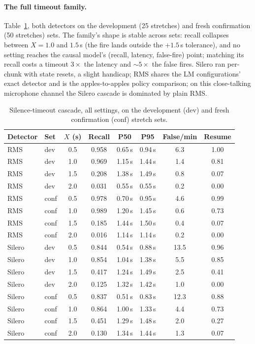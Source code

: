 \documentclass[11pt]{article}
\begin{document}
\paragraph{The full timeout family.} Table~\ref{tab:apptimeout}, both detectors on the development (25 stretches) and fresh confirmation (50 stretches) sets. The family's shape is stable across sets: recall collapses between $X{=}1.0$ and $1.5$\,s (the fire lands outside the $+1.5$\,s tolerance), and no setting reaches the causal model's (recall, latency, false-fire) point; matching its recall costs a timeout $3\times$ the latency and ${\sim}5\times$ the false fires. Silero \citep{silero2021vad} ran per-chunk with state resets, a slight handicap; RMS shares the LM configurations' exact detector and is the apples-to-apples policy comparison; on this close-talking microphone channel the Silero cascade is dominated by plain RMS.

\begin{table}[h]
  \centering\small
  \caption{Silence-timeout cascade, all settings, on the development (dev) and fresh confirmation (conf) stretch sets.}
  \label{tab:apptimeout}
  \begin{tabular}{llcccccc}
    \toprule
    Detector & Set & $X$ (s) & Recall & P50 & P95 & False/min & Resume \\
    \midrule
    RMS & dev & 0.5 & 0.958 & 0.65\,s & 0.94\,s & 6.3 & 1.00 \\
    RMS & dev & 1.0 & 0.969 & 1.15\,s & 1.44\,s & 1.4 & 0.81 \\
    RMS & dev & 1.5 & 0.208 & 1.38\,s & 1.49\,s & 0.8 & 0.07 \\
    RMS & dev & 2.0 & 0.031 & 0.55\,s & 0.55\,s & 0.2 & 0.00 \\
    RMS & conf & 0.5 & 0.978 & 0.70\,s & 0.95\,s & 4.6 & 0.99 \\
    RMS & conf & 1.0 & 0.989 & 1.20\,s & 1.45\,s & 0.6 & 0.73 \\
    RMS & conf & 1.5 & 0.185 & 1.44\,s & 1.50\,s & 0.4 & 0.07 \\
    RMS & conf & 2.0 & 0.016 & 1.14\,s & 1.14\,s & 0.2 & 0.00 \\
    Silero & dev & 0.5 & 0.844 & 0.54\,s & 0.88\,s & 13.5 & 0.96 \\
    Silero & dev & 1.0 & 0.854 & 1.04\,s & 1.38\,s & 5.5 & 0.85 \\
    Silero & dev & 1.5 & 0.417 & 1.24\,s & 1.49\,s & 2.5 & 0.41 \\
    Silero & dev & 2.0 & 0.125 & 1.32\,s & 1.42\,s & 1.0 & 0.00 \\
    Silero & conf & 0.5 & 0.837 & 0.51\,s & 0.83\,s & 12.3 & 0.88 \\
    Silero & conf & 1.0 & 0.864 & 1.00\,s & 1.33\,s & 4.4 & 0.73 \\
    Silero & conf & 1.5 & 0.451 & 1.29\,s & 1.48\,s & 2.0 & 0.27 \\
    Silero & conf & 2.0 & 0.130 & 1.34\,s & 1.44\,s & 1.3 & 0.07 \\
    \bottomrule
  \end{tabular}
\end{table}
\end{document}
